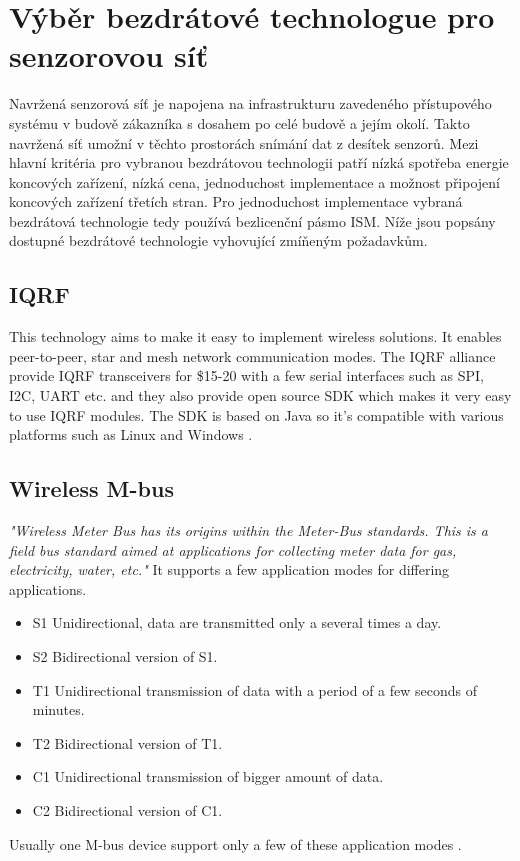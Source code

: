 \chapter{Výběr bezdrátové technologue pro senzorovou síť}
Navržená senzorová síť je napojena na infrastrukturu zavedeného přístupového systému v budově zákazníka s dosahem po celé budově a jejím okolí. Takto navržená síť umožní v těchto prostorách snímání dat z desítek senzorů.
Mezi hlavní kritéria pro vybranou bezdrátovou technologii patří nízká spotřeba energie koncových zařízení, nízká cena, jednoduchost implementace a možnost připojení koncových zařízení třetích stran.
Pro jednoduchost implementace vybraná bezdrátová technologie tedy používá bezlicenční pásmo ISM. 
Níže jsou popsány dostupné bezdrátové technologie vyhovující zmíňeným požadavkům.


\section{IQRF}
This technology aims to make it easy to implement wireless solutions. It enables peer-to-peer, star and mesh network communication modes. The IQRF alliance provide IQRF transceivers for \$15-20 with a few serial interfaces such as SPI, I2C, UART etc. and they also provide open source SDK which makes it very easy to use IQRF modules. The SDK is based on Java so it's compatible with various platforms such as Linux and Windows
\cite{1} \cite{2} \cite{3} \cite{4}.


\section{Wireless M-bus}
\textit{"Wireless Meter Bus has its origins within the Meter-Bus standards. This is a field bus standard aimed at applications for collecting meter data for gas, electricity, water, etc."} \cite{5}
It supports a few application modes for differing applications.
\begin{itemize}
  \item S1  Unidirectional, data are transmitted only a several times a day.
  \item S2	Bidirectional version of S1.
  \item	T1	Unidirectional transmission of data with a period of a few seconds of minutes.
  \item T2	Bidirectional version of T1.
  \item C1	Unidirectional transmission of bigger amount of data.
  \item C2	Bidirectional version of C1.
\end{itemize}
Usually one M-bus device support only a few of these application modes \cite{5} \cite{6} \cite{7} \cite{8}.


